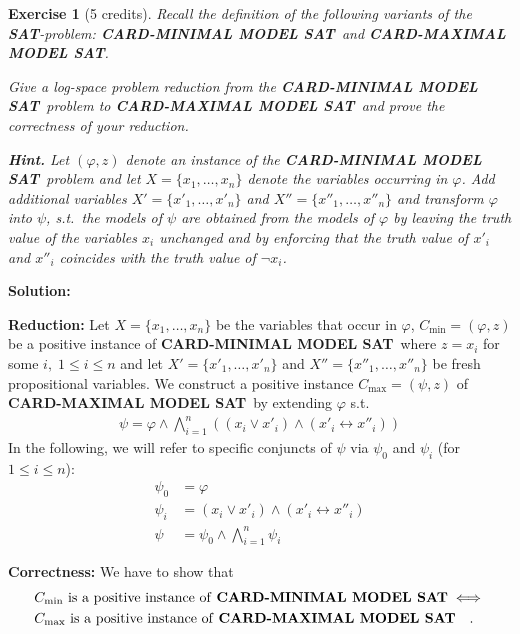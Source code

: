 \documentclass [11pt]{article}
\newtheorem{exercise}{Exercise}
\renewcommand{\phi}{\varphi}
\newcommand{\SAT}{\mbox{\bf SAT}}
\newcommand{\MINCARDSAT}{\textbf{CARD-MINIMAL MODEL SAT}}
\newcommand{\MAXCARDSAT}{\textbf{CARD-MAXIMAL MODEL SAT}}
\newcommand{\Cmin}{\ensuremath{C_\text{min}}}
\newcommand{\Cmax}{\ensuremath{C_\text{max}}}
\begin{document}
\medskip
\noindent
\begin{exercise}[5 credits]
{\em 
Recall the definition of the following variants of the \SAT -problem:
\MINCARDSAT\
and \MAXCARDSAT.
\smallskip

\noindent
Give a log-space problem reduction 
from the \MINCARDSAT\ problem to 
\MAXCARDSAT\ and prove the correctness of your reduction.
}%

\noindent
{\bf Hint.} Let $(\phi,z)$ denote an instance of the 
\MINCARDSAT\ problem and let $X = \{x_1, \dots, x_n\}$ denote the 
variables occurring in $\phi$. Add additional variables 
$X' = \{x'_1, \dots, x'_n\}$ and
$X'' = \{x''_1, \dots, x''_n\}$ and transform $\phi$ into $\psi$,
s.t.\  the models of $\psi$ are obtained from the models of $\phi$
by leaving the truth value of the variables $x_i$ unchanged and by
enforcing that the truth value of $x'_i$ and $x''_i$ coincides with 
the truth value of $\neg x_i$.
\end{exercise}

\noindent
\textbf{Solution:}

\noindent
\textbf{Reduction:}
Let $X = \{x_1,\dots, x_n\}$ be the variables that occur in $\phi$, $\Cmin = (\phi, z)$ be a positive instance of \MINCARDSAT\ where $z=x_i$ for some $i,\;1\leq i\leq n$ and let  $X' = \{x'_1,\dots, x'_n\}$ and $X'' = \{x''_1,\dots, x''_n\}$ be fresh propositional variables.
We construct a positive instance $\Cmax = (\psi, z)$ of \MAXCARDSAT\ by extending $\phi$ s.t.
\begin{align*}
\psi = \phi \land \bigwedge_{i=1}^{n} \left( (x_i \lor x'_i)  \land (x'_i \leftrightarrow x''_i) \right)
\end{align*}
In the following, we will refer to specific conjuncts of $\psi$ via  $\psi_0$ and $\psi_i$ (for $1 \leq i \leq n$):
\begin{align*}
\psi_0 &= \phi\\
\psi_i &= (x_i \lor x'_i)  \land (x'_i \leftrightarrow x''_i) \\
\psi &= \psi_0 \land \bigwedge_{i=1}^{n} \psi_i 
\end{align*}

\noindent
\textbf{Correctness:}
We have to show that 
\begin{align*}
&\Cmin \text{ is a positive instance of \MINCARDSAT} \iff \\
&\Cmax \text{ is a positive instance of \MAXCARDSAT} \quad .
\end{align*}
\end{document}
